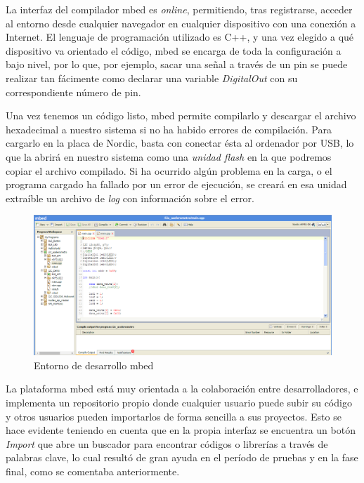La interfaz del compilador mbed es \textit{online}, permitiendo, tras registrarse, acceder al entorno desde cualquier navegador en cualquier dispositivo con una conexión a Internet. El lenguaje de programación utilizado es C++, y una vez elegido a qué dispositivo va orientado el código, mbed se encarga de toda la configuración a bajo nivel, por lo que, por ejemplo, sacar una señal a través de un pin se puede realizar tan fácimente como declarar una variable \textit{DigitalOut} con su correspondiente número de pin.

Una vez tenemos un código listo, mbed permite compilarlo y descargar el archivo hexadecimal a nuestro sistema si no ha habido errores de compilación. Para cargarlo en la placa de Nordic, basta con conectar ésta al ordenador por USB, lo que la abrirá en nuestro sistema como una \textit{unidad flash} en la que podremos copiar el archivo compilado. Si ha ocurrido algún problema en la carga, o el programa cargado ha fallado por un error de ejecución, se creará en esa unidad extraíble un archivo de \textit{log} con información sobre el error.

\begin{figure}[h]%
	\centering 	
    \includegraphics[width=\textwidth]{figures/mbed_compiler.PNG} %
   	\caption[Entorno de desarrollo mbed]{Entorno de desarrollo mbed}
   	\label{figuraMbedCompiler}

\end{figure}

La plataforma mbed está muy orientada a la colaboración entre desarrolladores, e implementa un repositorio propio donde cualquier usuario puede subir su código y otros usuarios pueden importarlos de forma sencilla a sus proyectos. Esto se hace evidente teniendo en cuenta que en la propia interfaz se encuentra un botón \textit{Import} que abre un buscador para encontrar códigos o librerías a través de palabras clave, lo cual resultó de gran ayuda en el período de pruebas y en la fase final, como se comentaba anteriormente.\\

